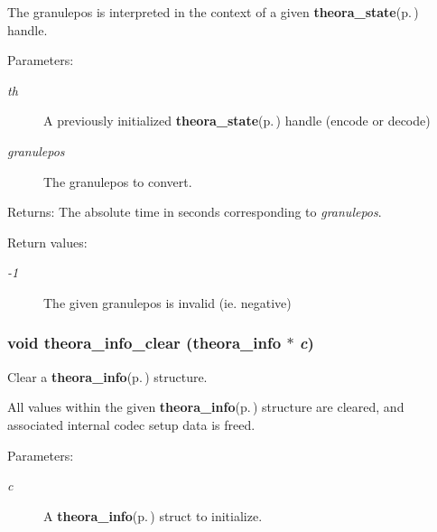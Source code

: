 The granulepos is interpreted in the context of a given {\bf theora\_\-state}{\rm (p.\,\pageref{structtheora__state})} handle. \begin{Desc}
\item[Parameters:]
\begin{description}
\item[{\em th}]A previously initialized {\bf theora\_\-state}{\rm (p.\,\pageref{structtheora__state})} handle (encode or decode) \item[{\em granulepos}]The granulepos to convert. \end{description}
\end{Desc}
\begin{Desc}
\item[Returns:]The absolute time in seconds corresponding to {\em granulepos\/}. \end{Desc}
\begin{Desc}
\item[Return values:]
\begin{description}
\item[{\em -1}]The given granulepos is invalid (ie. negative) \end{description}
\end{Desc}
\subsubsection{\setlength{\rightskip}{0pt plus 5cm}void theora\_\-info\_\-clear ({\bf theora\_\-info} $\ast$ {\em c})}\label{theora_8h_a30}


Clear a {\bf theora\_\-info}{\rm (p.\,\pageref{structtheora__info})} structure. 

All values within the given {\bf theora\_\-info}{\rm (p.\,\pageref{structtheora__info})} structure are cleared, and associated internal codec setup data is freed. \begin{Desc}
\item[Parameters:]
\begin{description}
\item[{\em c}]A {\bf theora\_\-info}{\rm (p.\,\pageref{structtheora__info})} struct to initialize. \end{description}
\end{Desc}
